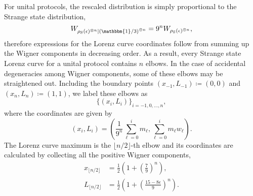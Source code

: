 \documentclass[
twocolumn,
superscriptaddress
]{revtex4-1}
\def\id{\mathbbm{1}}
\begin{document}
For unital protocols, the rescaled distribution is simply proportional to the Strange state distribution,
\begin{equation}
	W_{\rho_{\rm{S}}(\epsilon)^{\otimes n}|\left(\id/3\right)^{\otimes n}} = 9^n W_{\rho_{\rm{S}}(\epsilon)^{\otimes n}},
\end{equation}
therefore expressions for the Lorenz curve coordinates follow from summing up the Wigner components in decreasing order.
As a result, every Strange state Lorenz curve for a unital protocol contains $n$ elbows. In the case of accidental degeneracies among Wigner components, some of these elbows may be straightened out.
Including the boundary points $(x_{-1}, L_{-1}) \coloneqq (0,0)$ and $(x_{n}, L_{n}) \coloneqq (1,1)$, we label these elbows as 
\begin{equation*}
\{(x_{i}, L_{i})\}_{i=-1,0,\dots,n},
\end{equation*}
where the coordinates are given by
\begin{equation}
	(x_{i}, L_{i}) = \left( \frac{1}{9^n}\sum_{\ell=0}^i m_{\ell}, \sum_{\ell=0}^i m_{\ell} w_{\ell} \right).
\end{equation}
The Lorenz curve maximum is the $\lfloor n/2 \rfloor$-th elbow and its coordinates are calculated by collecting all the positive Wigner components,
\begin{align}
	x_{\lfloor n/2 \rfloor} &= \frac{1}{2}\left(1 + \left(\frac{7}{9}\right)^n\right), \\
	L_{\lfloor n/2 \rfloor} &= \frac{1}{2}\left (1 + \left(\frac{15 - 8\epsilon}{9}\right)^n \right).
\end{align}
\end{document}

